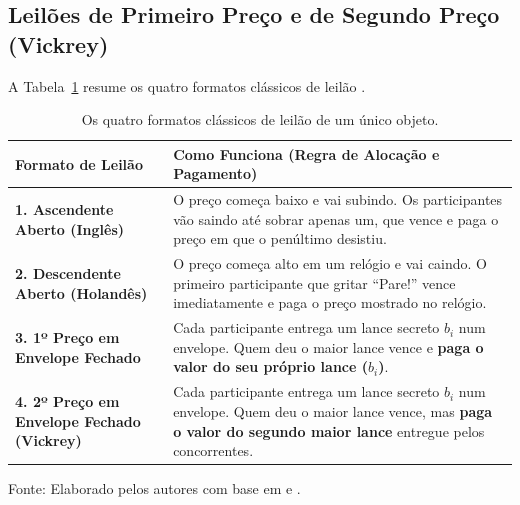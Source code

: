 \subsection{Leilões de Primeiro Preço e de Segundo Preço (Vickrey)}
\label{subsec:formatos_leilao}

A Tabela~\ref{tab:quatro_formatos} resume os quatro formatos clássicos de leilão \cite{vickrey1961,klemperer2004}.

\begin{table}[htbp]
\centering
\caption{Os quatro formatos clássicos de leilão de um único objeto.}
\label{tab:quatro_formatos}
\footnotesize
\begin{tabular}{p{4.3cm} p{10.5cm}}
\toprule
\textbf{Formato de Leilão} & \textbf{Como Funciona (Regra de Alocação e Pagamento)} \\
\midrule
\textbf{1. Ascendente Aberto (Inglês)} & O preço começa baixo e vai subindo. Os participantes vão saindo até sobrar apenas um, que vence e paga o preço em que o penúltimo desistiu. \\
\textbf{2. Descendente Aberto (Holandês)} & O preço começa alto em um relógio e vai caindo. O primeiro participante que gritar ``Pare!'' vence imediatamente e paga o preço mostrado no relógio. \\
\textbf{3. 1º Preço em Envelope Fechado} & Cada participante entrega um lance secreto $b_i$ num envelope. Quem deu o maior lance vence e \textbf{paga o valor do seu próprio lance ($b_i$)}. \\
\textbf{4. 2º Preço em Envelope Fechado (Vickrey)} & Cada participante entrega um lance secreto $b_i$ num envelope. Quem deu o maior lance vence, mas \textbf{paga o valor do segundo maior lance} entregue pelos concorrentes. \\
\bottomrule
\end{tabular}
\par\vspace{0.05cm}
{\footnotesize Fonte: Elaborado pelos autores com base em \cite{vickrey1961} e \cite[p.~11--12]{klemperer2004}.}
\end{table}

